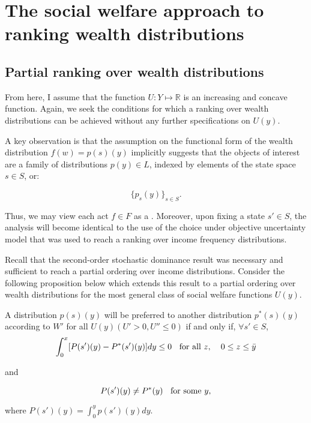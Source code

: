 \documentclass[\econtexRoot/IneqMeas]{subfiles}
\begin{document}
\onlyinsubfile{\setcounter{section}{4}}
\section{The social welfare approach to ranking wealth distributions}
\notinsubfile{\label{sec:SWFapproach}}

\subsection{Partial ranking over wealth distributions}

\par From here, I assume that the function $U: Y \mapsto \mathbb{R} $ is an increasing and concave function. Again, we seek the conditions for which a ranking over wealth distributions can be achieved without any further specifications on $U(y)$.

\par A key observation is that the assumption on the functional form of the wealth distribution $f(w) = p(s)(y)$ implicitly suggests that the objects of interest are a family of distributions $p(y) \in L$, indexed by elements of the state space $s \in S$, or:

$$\{ p_s(y) \}_{s \in S}.$$

\par Thus, we may view each act $f \in F$ as a . Moreover, upon fixing a state $s' \in S$, the analysis will become identical to the use of the choice under objective uncertainty model that was used to reach a ranking over income frequency distributions. 

\par Recall that the second-order stochastic dominance result was necessary and sufficient to reach a partial ordering over income distributions. Consider the following proposition below which extends this result to a partial ordering over wealth distributions for the most general class of social welfare functions $U(y)$.

\begin{prop}
A distribution $p(s)(y)$ will be preferred to another distribution $p^{*}(s)(y)$ according to $W'$ for all $U(y) (U' > 0, U'' \leq 0)$ if and only if, $\forall s' \in S$,
$$ \int_{0}^{x} [P(s')(y) -P^{*}(s')(y)]dy \leq 0 \text{\hspace{2mm} for all $z$, \hspace{2mm} $0 \leq z \leq \bar{y}$} $$  

and 

$$ P(s')(y) \neq P^{*}(y) \text{\hspace{2mm} for some $y$,}$$

where $P(s')(y) = \int_{0}^{y} p(s')(y)dy. $
\end{prop}
\end{document}
